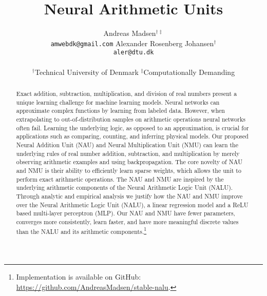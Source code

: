 \documentclass{article}
\title{Neural Arithmetic Units}
\author{%
  Andreas Madsen$^{\dag\ddag}$ \\
  \texttt{amwebdk@gmail.com}
  \AND
  Alexander Rosenberg Johansen$^{\dag}$ \\
  \texttt{aler@dtu.dk} \\
  \\
$^\dag$Technical University of Denmark \quad
$^\ddag$Computationally Demanding
}
\begin{document}
\maketitle

\begin{abstract}
Exact addition, subtraction, multiplication, and division of real numbers present a unique learning challenge for machine learning models.
Neural networks can approximate complex functions by learning from labeled data.
However, when extrapolating to out-of-distribution samples on arithmetic operations neural networks often fail. Learning the underlying logic, as opposed to an approximation, is crucial for applications such as comparing, counting, and inferring physical models.
Our proposed Neural Addition Unit (NAU) and Neural Multiplication Unit (NMU) can learn the underlying rules of real number addition, subtraction, and multiplication by merely observing arithmetic examples and using backpropagation.
The core novelty of NAU and NMU is their ability to efficiently learn sparse weights, which allows the unit to perform exact arithmetic operations.
The NAU and NMU are inspired by the underlying arithmetic components of the Neural Arithmetic Logic Unit (NALU).
Through analytic and empirical analysis we justify how the NAU and NMU improve over the Neural Arithmetic Logic Unit (NALU), a linear regression model and a ReLU based multi-layer perceptron (MLP).
Our NAU and NMU have fewer parameters, converges more consistently, learn faster, and have more meaningful discrete values than the NALU and its arithmetic components.\ifdefined\nonanonymous\footnote{Implementation is available on GitHub: \url{https://github.com/AndreasMadsen/stable-nalu}.}\fi
\end{abstract}
\end{document}
